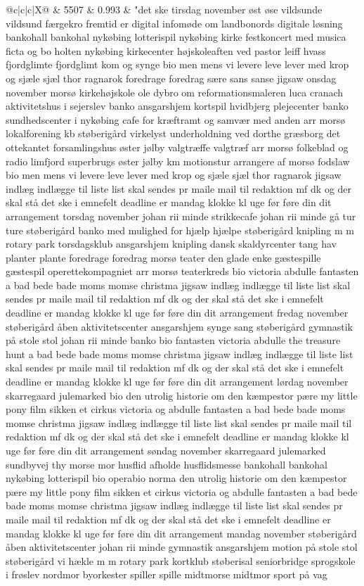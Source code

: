 \begin{xltabular}{\linewidth}{@{}c|c|c|X@{}}
		 & 5507 & 0.993 & "det ske tirsdag november øst øse vildsunde vildsund færgekro fremtid er digital infomøde om landbonords digitale løsning bankohall bankohal nykøbing lotterispil nykøbing kirke festkoncert med musica ficta og bo holten nykøbing kirkecenter højskoleaften ved pastor leiff hvass fjordglimte fjordglimt kom og synge bio men mens vi levere leve lever med krop og sjæle sjæl thor ragnarok foredrage foredrag sære sans sanse jigsaw onsdag november morsø kirkehøjskole ole dybro om reformationsmaleren luca cranach aktivitetshus i sejerslev banko ansgarshjem kortspil hvidbjerg plejecenter banko sundhedscenter i nykøbing cafe for kræftramt og samvær med anden arr morsø lokalforening kb støberigård virkelyst underholdning ved dorthe græsborg det ottekantet forsamlingshus øster jølby valgtræffe valgtræf arr morsø folkeblad og radio limfjord superbrugs øster jølby km motionstur arrangere af morsø fodslaw bio men mens vi levere leve lever med krop og sjæle sjæl thor ragnarok jigsaw indlæg indlægge til liste list skal sendes pr maile mail til redaktion mf dk og der skal stå det ske i emnefelt deadline er mandag klokke kl uge før føre din dit arrangement torsdag november johan rii minde strikkecafe johan rii minde gå tur ture støberigård banko med mulighed for hjælp hjælpe støberigård knipling m m rotary park torsdagsklub ansgarshjem knipling dansk skaldyrcenter tang hav planter plante foredrage foredrag morsø teater den glade enke gæstespille gæstespil operettekompagniet arr morsø teaterkreds bio victoria abdulle fantasten a bad bede bade moms momse christma jigsaw indlæg indlægge til liste list skal sendes pr maile mail til redaktion mf dk og der skal stå det ske i emnefelt deadline er mandag klokke kl uge før føre din dit arrangement fredag november støberigård åben aktivitetscenter ansgarshjem synge sang støberigård gymnastik på stole stol johan rii minde banko bio fantasten victoria abdulle the treasure hunt a bad bede bade moms momse christma jigsaw indlæg indlægge til liste list skal sendes pr maile mail til redaktion mf dk og der skal stå det ske i emnefelt deadline er mandag klokke kl uge før føre din dit arrangement lørdag november skarregaard julemarked bio den utrolig historie om den kæmpestor pære my little pony film sikken et cirkus victoria og abdulle fantasten a bad bede bade moms momse christma jigsaw indlæg indlægge til liste list skal sendes pr maile mail til redaktion mf dk og der skal stå det ske i emnefelt deadline er mandag klokke kl uge før føre din dit arrangement søndag november skarregaard julemarked sundbyvej thy morse mor husflid afholde husflidsmesse bankohall bankohal nykøbing lotterispil bio operabio norma den utrolig historie om den kæmpestor pære my little pony film sikken et cirkus victoria og abdulle fantasten a bad bede bade moms momse christma jigsaw indlæg indlægge til liste list skal sendes pr maile mail til redaktion mf dk og der skal stå det ske i emnefelt deadline er mandag klokke kl uge før føre din dit arrangement mandag november støberigård åben aktivitetscenter johan rii minde gymnastik ansgarshjem motion på stole stol støberigård vi hækle m m rotary park kortklub støberisal seniorbridge sprogskole i frøslev nordmor byorkester spiller spille midtmorse midtmor sport på vag 
\end{xltabular}
